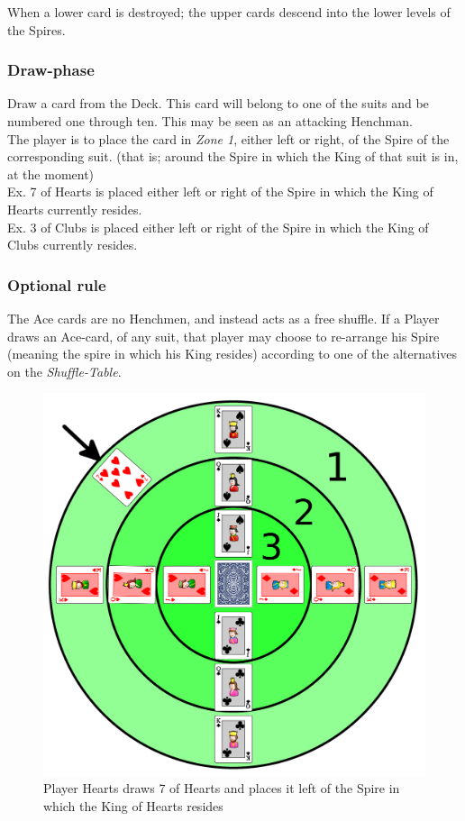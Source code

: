 \documentclass[11pt]{article} %
\begin{document}
\noindent
When a lower card is destroyed; the upper cards descend into the lower levels of the Spires.

\subsubsection{Draw-phase}
Draw a card from the Deck. This card will belong to one of the suits and be numbered one through ten. This may be seen as an attacking Henchman. \\
The player is to place the card in \textit{Zone 1}, either left or right, of the Spire of the corresponding suit. (that is; around the Spire in which the King of that suit is in, at the moment) \\
Ex. 7 of Hearts is placed either left or right of the Spire in which the King of Hearts currently resides. \\
Ex. 3 of Clubs is placed either left or right of the Spire in which the King of Clubs currently resides.

\subsubsection{Optional rule}
The Ace cards are no Henchmen, and instead acts as a free shuffle. If a Player draws an Ace-card, of any suit, that player may choose to re-arrange his Spire (meaning the spire in which his King resides) according to one of the alternatives on the \textit{Shuffle-Table}.

\begin{figure}[h!]
\centering
\includegraphics[scale=0.08]{draw.png}
\caption{Player Hearts draws 7 of Hearts and places it left of the Spire in which the King of Hearts resides}
\label{starting}
\end{figure}
\end{document}
